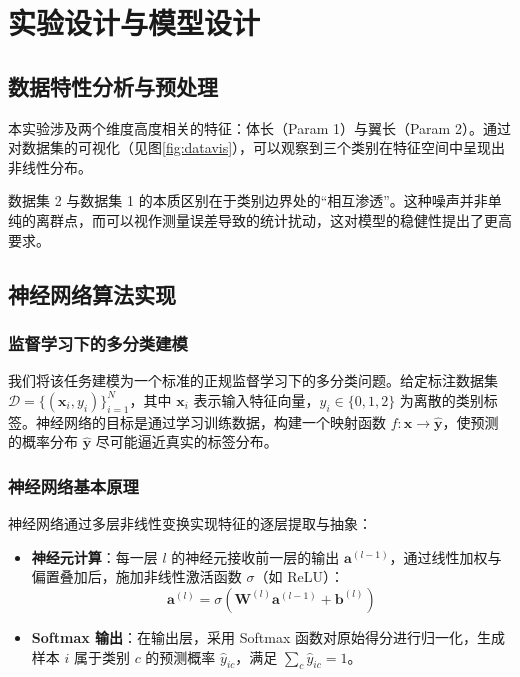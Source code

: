 \section{实验设计与模型设计}

\subsection{数据特性分析与预处理}
本实验涉及两个维度高度相关的特征：体长（Param 1）与翼长（Param 2）。通过对数据集的可视化（见图\ref{fig:datavis}），可以观察到三个类别在特征空间中呈现出非线性分布。

数据集 2 与数据集 1 的本质区别在于类别边界处的“相互渗透”。这种噪声并非单纯的离群点，而可以视作测量误差导致的统计扰动，这对模型的稳健性提出了更高要求。

\subsection{神经网络算法实现}

\subsubsection{监督学习下的多分类建模}
我们将该任务建模为一个标准的正规{监督学习}下的{多分类}问题。给定标注数据集 $\mathcal{D} = \{(\mathbf{x}_i, y_i)\}_{i=1}^N$，其中 $\mathbf{x}_i$ 表示输入特征向量，$y_i \in \{0, 1, 2\}$ 为离散的类别标签。神经网络的目标是通过学习训练数据，构建一个映射函数 $f: \mathbf{x} \to \hat{\mathbf{y}}$，使预测的概率分布 $\hat{\mathbf{y}}$ 尽可能逼近真实的标签分布。

\subsubsection{神经网络基本原理}
神经网络通过多层非线性变换实现特征的逐层提取与抽象：
\begin{itemize}
	\item \textbf{神经元计算}：每一层 $l$ 的神经元接收前一层的输出 $\mathbf{a}^{(l-1)}$，通过线性加权与偏置叠加后，施加非线性激活函数 $\sigma$（如 ReLU）：
	$$ \mathbf{a}^{(l)} = \sigma(\mathbf{W}^{(l)} \mathbf{a}^{(l-1)} + \mathbf{b}^{(l)}) $$
	\item \textbf{Softmax 输出}：在输出层，采用 Softmax 函数对原始得分进行归一化，生成样本 $i$ 属于类别 $c$ 的预测概率 $\hat{y}_{ic}$，满足 $\sum_c \hat{y}_{ic} = 1$。
\end{itemize}


